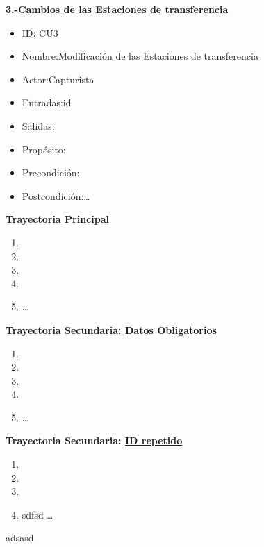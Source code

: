 \documentclass[10pt]{book}
\begin{document}
	
	\textbf{{\Large 3.-Cambios de las Estaciones de transferencia}}
	\vspace{5 mm}
	
	\begin{itemize}
		
		\item ID: CU3
		\item Nombre:Modificación de las Estaciones de transferencia
		\item Actor:Capturista
		\item Entradas:id
		\item Salidas:
		\item Propósito:
		\item Precondición:
		\item Postcondición:\ldots 
	\end{itemize}
	\vspace{5 mm}
	
	\textbf {Trayectoria Principal}
	\begin{enumerate}
		\item 
		\item 
		\item 
		\item 
		\item \ldots
		
	\end{enumerate}
	
	\textbf {Trayectoria Secundaria: \underline{Datos Obligatorios}}
	\begin{enumerate}
		\item 
		\item 
		\item 
		\item 
		\item \ldots
		
	\end{enumerate}
	
	
	\textbf {Trayectoria Secundaria: \underline{ID repetido}}
	\begin{enumerate}
		\item 
		\item 
		\item 
		\item sdfsd \ldots
	\end{enumerate}
	
	\vspace{10cm}
	adsasd
	
\end{document}
